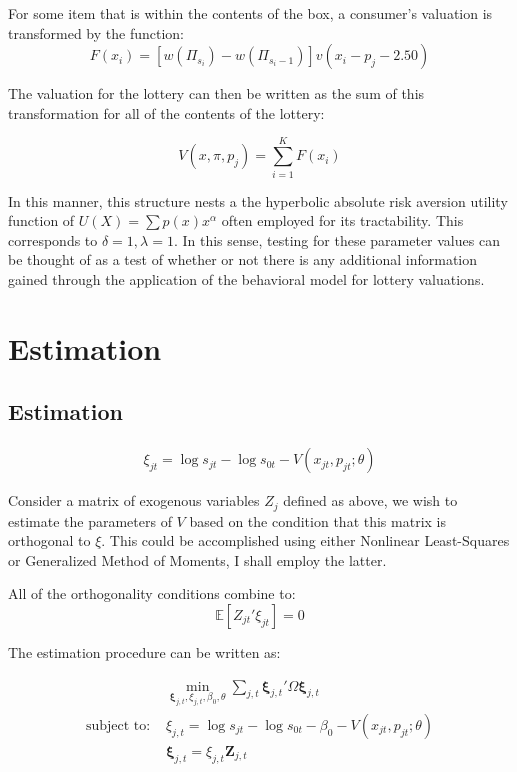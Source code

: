 \documentclass[12pt]{paper}
\newcommand{\brak}[1]{ \left [ #1 \right ] }
\newcommand{\exV}[1]{\mathbb{E} \left [ #1 \right ]}
\begin{document}
For some item that is within the contents of the box, a consumer's
valuation is transformed by the function:
\begin{equation*}
F(x_i) = \brak{w( \Pi_{s_i}) - w(\Pi_{s_i - 1}) } v( x_i - p_j - 2.50)
\end{equation*}

The valuation for the lottery can then be written as the sum of this
transformation for all of the contents of the lottery:

\begin{equation*}
  V(x,\pi,p_j) = \sum_{i=1}^K F( x_i)
\end{equation*}

In this manner, this structure nests a the hyperbolic absolute risk
aversion utility function of $U(X) = \sum p(x) x^{\alpha}$ often employed for
its tractability. This corresponds to $\delta = 1, \lambda = 1$. In this sense,
testing for these parameter values can be thought of as a test of
whether or not there is any additional information gained through the
application of the behavioral model for lottery valuations.


\section{Estimation}

\subsection{Estimation}

\begin{align*}
  \xi_{jt} = \log s_{jt} - \log s_{0t} - V( x_{jt}, p_{jt}; \theta)
\end{align*}


Consider a matrix of exogenous variables $Z_j$ defined as above, we wish
to estimate the parameters of $V$ based on the condition that this
matrix is orthogonal to $\xi$. This could be accomplished using either
Nonlinear Least-Squares or Generalized Method of Moments, I shall
employ the latter.

All of the orthogonality conditions combine to:
\begin{equation*}
  \exV{Z_{jt}'\xi_{jt}} = 0
\end{equation*}

The estimation procedure can be written as:

\begin{align}
  &\min_{\bm{\xi}_{j,t}, \xi_{j,t}, \beta_0, \theta} \sum_{j,t}\bm{\xi}_{j,t}' \Omega \bm{\xi}_{j,t}\\
  \text{subject to: } &\xi_{j,t} = \log s_{jt} - \log s_{0t} - \beta_0
                        - V( x_{jt}, p_{jt}; \theta)\\
  &\bm{\xi}_{j,t} = \xi_{j,t} \bm{Z}_{j,t}  
\end{align}
\end{document}
